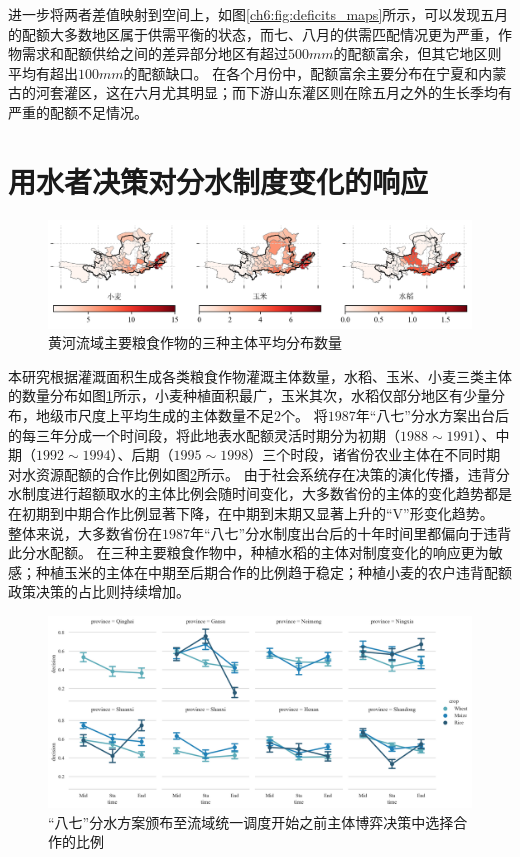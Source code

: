 进一步将两者差值映射到空间上，如图\ref{ch6:fig:deficits_maps}所示，可以发现五月的配额大多数地区属于供需平衡的状态，而七、八月的供需匹配情况更为严重，作物需求和配额供给之间的差异部分地区有超过$500mm$的配额富余，但其它地区则平均有超出$100mm$的配额缺口。
在各个月份中，配额富余主要分布在宁夏和内蒙古的河套灌区，这在六月尤其明显；而下游山东灌区则在除五月之外的生长季均有严重的配额不足情况。

\section{用水者决策对分水制度变化的响应}

\begin{figure}[htb]
    \centering
    \includegraphics[width=\textwidth]{img/ch6/ch6_agents.png}
    \caption{黄河流域主要粮食作物的三种主体平均分布数量}\label{ch6:fig:agents}
\end{figure}

本研究根据灌溉面积生成各类粮食作物灌溉主体数量，水稻、玉米、小麦三类主体的数量分布如图\ref{ch6:fig:agents}所示，小麦种植面积最广，玉米其次，水稻仅部分地区有少量分布，地级市尺度上平均生成的主体数量不足$2$个。
将$1987$年“八七”分水方案出台后的每三年分成一个时间段，将此地表水配额灵活时期分为初期（$1988 \sim 1991$）、中期（$1992 \sim 1994$）、后期（$1995 \sim 1998$）三个时段，诸省份农业主体在不同时期对水资源配额的合作比例如图\ref{ch6:fig:compliacne}所示。
由于社会系统存在决策的演化传播，违背分水制度进行超额取水的主体比例会随时间变化，大多数省份的主体的变化趋势都是在初期到中期合作比例显著下降，在中期到末期又显著上升的“V”形变化趋势。
整体来说，大多数省份在$1987$年“八七”分水制度出台后的十年时间里都偏向于违背此分水配额。
在三种主要粮食作物中，种植水稻的主体对制度变化的响应更为敏感；种植玉米的主体在中期至后期合作的比例趋于稳定；种植小麦的农户违背配额政策决策的占比则持续增加。


\begin{figure}[htb]
    \centering
    \includegraphics[width=\textwidth]{img/ch6/ch6_compliance.png}
    \caption{“八七”分水方案颁布至流域统一调度开始之前主体博弈决策中选择合作的比例}\label{ch6:fig:compliacne}
\end{figure}

